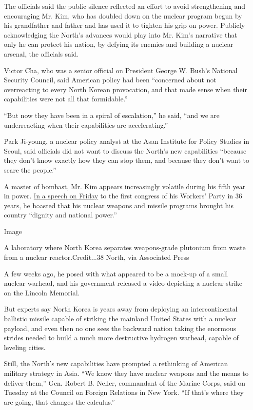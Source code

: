 The officials said the public silence reflected an effort to avoid
strengthening and encouraging Mr. Kim, who has doubled down on the
nuclear program begun by his grandfather and father and has used it to
tighten his grip on power. Publicly acknowledging the North's advances
would play into Mr. Kim's narrative that only he can protect his nation,
by defying its enemies and building a nuclear arsenal, the officials
said.

Victor Cha, who was a senior official on President George W. Bush's
National Security Council, said American policy had been ``concerned
about not overreacting to every North Korean provocation, and that made
sense when their capabilities were not all that formidable.''

``But now they have been in a spiral of escalation,'' he said, ``and we
are underreacting when their capabilities are accelerating.''

Park Ji-young, a nuclear policy analyst at the Asan Institute for Policy
Studies in Seoul, said officials did not want to discuss the North's new
capabilities ``because they don't know exactly how they can stop them,
and because they don't want to scare the people.''

A master of bombast, Mr. Kim appears increasingly volatile during his
fifth year in power.
\href{http://www.nytimes3xbfgragh.onion/2016/05/07/world/asia/north-korea-congress.html?_r=0}{In
a speech on Friday} to the first congress of his Workers' Party in 36
years, he boasted that his nuclear weapons and missile programs brought
his country ``dignity and national power.''

Image

A laboratory where North Korea separates weapons-grade plutonium from
waste from a nuclear reactor.Credit...38 North, via Associated Press

A few weeks ago, he posed with what appeared to be a mock-up of a small
nuclear warhead, and his government released a video depicting a nuclear
strike on the Lincoln Memorial.

But experts say North Korea is years away from deploying an
intercontinental ballistic missile capable of striking the mainland
United States with a nuclear payload, and even then no one sees the
backward nation taking the enormous strides needed to build a much more
destructive hydrogen warhead, capable of leveling cities.

Still, the North's new capabilities have prompted a rethinking of
American military strategy in Asia. ``We know they have nuclear weapons
and the means to deliver them,'' Gen. Robert B. Neller, commandant of
the Marine Corps, said on Tuesday at the Council on Foreign Relations in
New York. ``If that's where they are going, that changes the calculus.''


